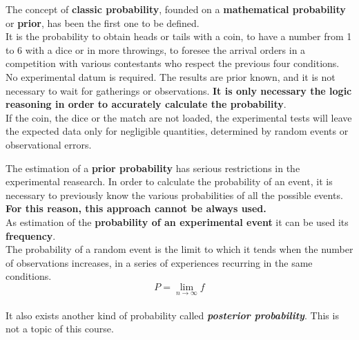 \begin{frame}
  The concept of \textbf{classic probability}, founded on a \textbf{mathematical probability} or \textbf{prior}, has been the first one to be defined.\\
  \vspace*{.25cm}
  It is the probability to obtain heads or tails with a coin, to have a number from 1 to 6 with a dice or in more throwings, to foresee the arrival orders in a competition with various contestants who respect the previous four conditions.\\
  \vspace*{.25cm}
  No experimental datum is required. The results are prior known, and it is not necessary to wait for gatherings or observations. \textbf{It is only necessary the logic reasoning in order to accurately calculate the probability}.\\
  \vspace*{.25cm}
  If the coin, the dice or the match are not loaded, the experimental tests will leave the expected data only for negligible quantities, determined by random events or observational errors.
\end{frame}

\begin{frame}
  The estimation of a \textbf{prior probability} has serious restrictions in the experimental reasearch. In order to calculate the probability of an event, it is necessary to previously know the various probabilities of all the possible events.\\
  \vspace*{.25cm}
  \textbf{For this reason, this approach cannot be always used.}\\
  \vspace*{.25cm}
  As estimation of the \textbf{probability of an experimental event} it can be used its \textbf{frequency}.\\
  \vspace*{.2cm}
  The probability of a random event is the limit to which it tends when the number of observations increases, in a series of experiences recurring in the same conditions.
  $$ P = \lim_{n\rightarrow\infty}{f} $$\\
  It also exists another kind of probability called \textit{\textbf{posterior probability}}. This is not a topic of this course. 
\end{frame}

